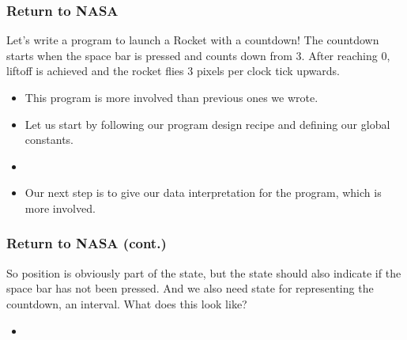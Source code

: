 \documentclass{beamer}
\begin{document}

\begin{frame}
  \frametitle{Return to NASA}
  Let's write a program to launch a Rocket with a countdown!
  The countdown starts when the space bar is pressed and counts down from
  3. After reaching 0, liftoff is achieved and the rocket flies 3 pixels
  per clock tick upwards.
  \begin{itemize}
  \item<2-> This program is more involved than previous ones we wrote.
  \item<3-> Let us start by following our program design recipe and
    defining our global constants.
  \item<4-> \rocketConstants
  \item<5-> Our next step is to give our data interpretation for the program,
    which is more involved.
  \end{itemize}
\end{frame}



\begin{frame}
  \frametitle{Return to NASA (cont.)}
  So position is obviously part of the state, but the state
  should also indicate if the space bar has not been pressed. And we also
  need state for representing the countdown, an interval. What does this look like?
  \begin{itemize}
  \item<2-> \LRCD
  \end{itemize}  
\end{frame}
\end{document}
